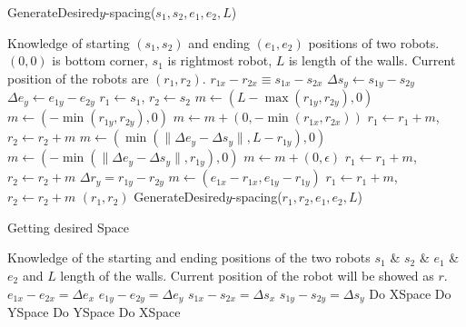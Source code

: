 \begin{algorithm}
\caption{GenerateDesired$y$-spacing($s_1,s_2,e_1,e_2,L$)}\label{alg:YControl}
\begin{algorithmic}[1]
\Require Knowledge of starting $(s_1,s_2)$ and ending $(e_1,e_2)$ positions of  two robots. 
$(0,0)$ is bottom corner, $s_1$ is rightmost robot, 
 $L$ is length of the walls. Current position of the robots are $(r_1,r_2)$.
\Ensure   $ r_{1x} - r_{2x}  \equiv s_{1x} - s_{2x} $   %
\State $ \Delta s_y  \gets s_{1y} - s_{2y} $
\State $ \Delta e_y \gets e_{1y} - e_{2y} $
\State $ r_1 \gets s_1$, $ r_2 \gets s_2$
\State $ m \gets ( L-\max( r_{1y},r_{2y}) ,0)   $ 
\Else 
\State  $ m \gets ( -\min( r_{1y},r_{2y}),0 )    $ 
\EndIf
\State $m  \gets  m + (0, -\min( r_{1x},r_{2x} ))$ 
\State $ r_1 \gets r_1+m$, $ r_2 \gets r_2+m$ 
\State $ m \gets (\min(\|\Delta e_y - \Delta s_y \|, L- r_{1y}), 0)$  
\Else
\State $ m \gets (-\min(\|\Delta e_y - \Delta s_y \|, r_{1y}), 0)$
\EndIf 
\State $m  \gets  m + (0, \epsilon)$ 
\State $ r_1 \gets r_1+m$, $ r_2 \gets r_2+m$ 
\State $\Delta r_y = r_{1y} - r_{2y}$
\State   $ m \gets (e_{1x}-r_{1x}, e_{1y}-r_{1y})$
\State $ r_1 \gets r_1+m$, $ r_2 \gets r_2+m$ 
\State  \Return $(r_1,r_2)$
\Else   
\State \Return GenerateDesired$y$-spacing($r_1,r_2,e_1,e_2,L$)
\EndIf
\end{algorithmic}
\end{algorithm}

\begin{algorithm}
\caption{Getting desired Space}\label{alg:PosControl2Robots}
\begin{algorithmic}[1]
\Require Knowledge of the starting and ending positions  of the two robots $s_1$  \& $s_2$  \& $e_1$  \& $e_2$  and $L$ length of the walls. Current position of the robot will be showed as $r$.
\State $e_{1x} - e_{2x} = \Delta e_x$
\State $e_{1y} - e_{2y} = \Delta e_y$
\State $s_{1x} - s_{2x} = \Delta s_x$
\State $s_{1y} - s_{2y} = \Delta s_y$
\State Do XSpace
\State Do YSpace
\Else
\State Do YSpace
\State Do XSpace
\EndIf

\end{algorithmic}
\end{algorithm}


